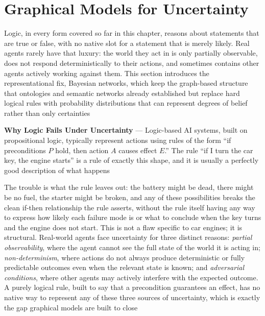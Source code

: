 \section{Graphical Models for Uncertainty}
\label{sec:graphical-models-uncertainty}

Logic, in every form covered so far in this chapter, reasons about
statements that are true or false, with no native slot for a statement
that is merely likely. Real agents rarely have that luxury: the world they
act in is only partially observable, does not respond deterministically to
their actions, and sometimes contains other agents actively working against
them. This section introduces the representational fix, Bayesian
networks, which keep the graph-based structure that ontologies and
semantic networks already established but replace hard logical rules with
probability distributions that can represent degrees of belief rather than
only certainties

\textbf{Why Logic Fails Under Uncertainty} --- Logic-based AI systems, built
on propositional logic, typically represent actions using rules of the
form ``if preconditions $P$ hold, then action $A$ causes effect $E$.'' The
rule ``if I turn the car key, the engine starts'' is a rule of exactly this
shape, and it is usually a perfectly good description of what happens

The trouble is what the rule leaves out: the battery might be dead, there
might be no fuel, the starter might be broken, and any of these
possibilities breaks the clean if-then relationship the rule asserts,
without the rule itself having any way to express how likely each failure
mode is or what to conclude when the key turns and the engine does not
start. This is not a flaw specific to car engines; it is structural.
Real-world agents face uncertainty for three distinct reasons: \emph{partial
observability}, where the agent cannot see the full state of the world it
is acting in; \emph{non-determinism}, where actions do not always produce
deterministic or fully predictable outcomes even when the relevant state is
known; and \emph{adversarial conditions}, where other agents may actively
interfere with the expected outcome. A purely logical rule, built to say
that a precondition guarantees an effect, has no native way to represent
any of these three sources of uncertainty, which is exactly the gap
graphical models are built to close

